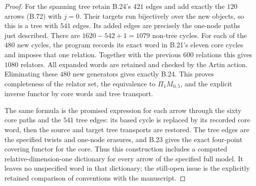 \begin{proof}
For the spanning tree retain B.24's $421$ edges and
add exactly the $120$ arrows (B.72) with $j=0$.
Their targets run bijectively over the new objects,
so this is a tree with $541$ edges.  Its added edges
are precisely the one-node paths just described.
There are $1620-542+1=1079$ non-tree cycles.  For each
of the $480$ new cycles, the program records its exact
word in B.21's eleven core cycles and imposes that
one relation.  Together with the previous $600$
relations this gives $1080$ relators.  All expanded
words are retained and checked by the Artin action.
Eliminating these $480$ new generators gives exactly
B.24.  This proves completeness of the relator set,
the equivalence to $\Pi_1M_{0,5}$, and the explicit
inverse functor by core words and tree transport.

The same formula is the promised expression for each
arrow through the sixty core paths and the $541$
tree edges: its based cycle is replaced by its recorded
core word, then the source and target tree transports
are restored.  The tree edges are the specified
twists and one-node erasures, and B.23 gives the exact
four-point covering functor for the core.  Thus this
construction includes a computed relative-dimension-one
dictionary for every arrow of the specified full model.
It leaves no unspecified word in that dictionary;
the still-open issue is the explicitly retained comparison
of conventions with the manuscript.
\end{proof}

